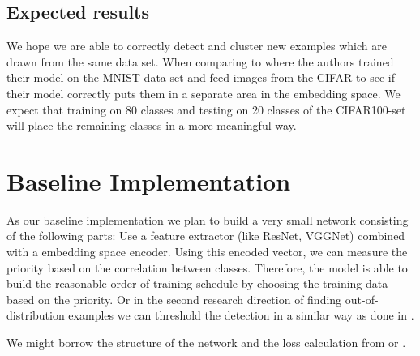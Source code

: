 \subsection{Expected results}
We hope we are able to correctly detect and cluster new examples which are drawn from the same data set. When comparing to \cite{yang2018robust} where the authors trained their model on the MNIST data set and feed images from the CIFAR to see if their model correctly puts them in a separate area in the embedding space. We expect that training on 80 classes and testing on 20 classes of the CIFAR100-set will place the remaining classes in a more meaningful way. 

\section{Baseline Implementation}

As our baseline implementation we plan to build a very small network consisting of the following parts: Use a feature extractor (like ResNet, VGGNet) combined with a embedding space encoder. Using this encoded vector, we can measure the priority based on the correlation between classes. 
Therefore, the model is able to build the reasonable order of training schedule by choosing the training data based on the priority. Or in the second research direction of finding out-of-distribution examples we can threshold the detection in a similar way as done in \cite{yang2018robust}.

We might borrow the structure of the network and the loss calculation from \cite{edwards2016towards} or \cite{snell2017prototypical}.
